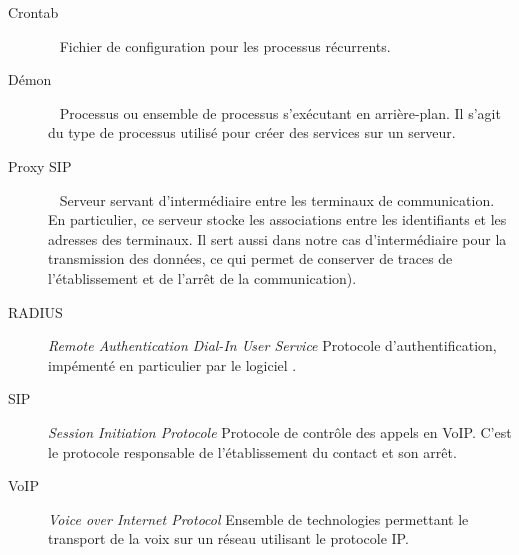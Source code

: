 
\begin{description}
	\item[Crontab] ~ \newline Fichier de configuration pour les processus récurrents.
	\item[Démon]  ~ \newline Processus ou ensemble de processus s’exécutant en arrière-plan. Il s’agit du type de processus utilisé pour créer des services sur un serveur.
	\item[Proxy SIP] ~ \newline Serveur servant d’intermédiaire entre les terminaux de communication. En particulier, ce serveur stocke les associations entre les identifiants et les adresses des terminaux. Il sert aussi dans notre cas d’intermédiaire pour la transmission des données, ce qui permet de conserver de traces de l’établissement et de l’arrêt de la communication).
	\item[RADIUS] \textit{Remote Authentication Dial-In User Service} \newline Protocole d’authentification, impémenté en particulier par le logiciel \frad.
	\item[SIP] \textit{Session Initiation Protocole} \newline Protocole de contrôle des appels en VoIP. C’est le protocole responsable de l’établissement du contact et son arrêt.
	\item[VoIP] \textit{Voice over Internet Protocol} \newline Ensemble de technologies permettant le transport de la voix sur un réseau utilisant le protocole IP.
\end{description}
